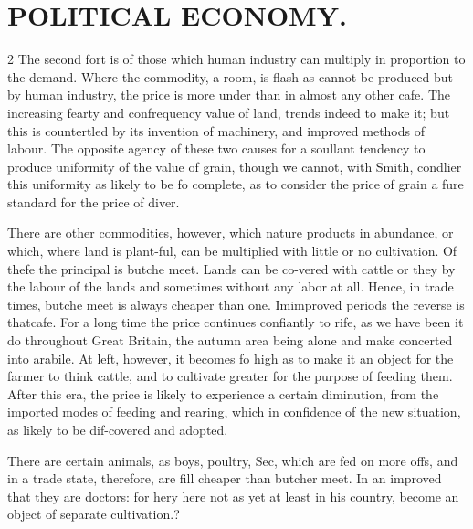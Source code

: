 \documentclass[10pt]{article}
\begin{document}
\section*{\centering POLITICAL ECONOMY.}
\begin{multicols}{2}\raggedcolumns
The second fort is of those which human industry can multiply in proportion to the demand. Where the commodity, a room, is flash as cannot be produced but by human industry, the price is more under than in almost any other cafe. The increasing fearty and confrequency value of land, trends indeed to make it; but this is countertled by its invention of machinery, and improved methods of labour. The opposite agency of these two causes for a soullant tendency to produce uniformity of the value of grain, though we cannot, with Smith, condlier this uniformity as likely to be fo complete, as to consider the price of grain a fure standard for the price of diver.

There are other commodities, however, which nature products in abundance, or which, where land is plant-ful, can be multiplied with little or no cultivation. Of thefe the principal is butche meet. Lands can be co-vered with cattle or they by the labour of the lands and sometimes without any labor at all. Hence, in trade times, butche meet is always cheaper than one. Imimproved periods the reverse is thatcafe. For a long time the price continues confiantly to rife, as we have been it do throughout Great Britain, the autumn area being alone and make concerted into arabile. At left, however, it becomes fo high as to make it an object for the farmer to think cattle, and to cultivate greater for the purpose of feeding them. After this era, the price is likely to experience a certain diminution, from the imported modes of feeding and rearing, which in confidence of the new situation, as likely to be dif-covered and adopted.

There are certain animals, as boys, poultry, Sec, which are fed on more offs, and in a trade state, therefore, are fill cheaper than butcher meet. In an improved that they are doctors: for hery here not as yet at least in his country, become an object of separate cultivation.?


\end{multicols}
\end{document}

